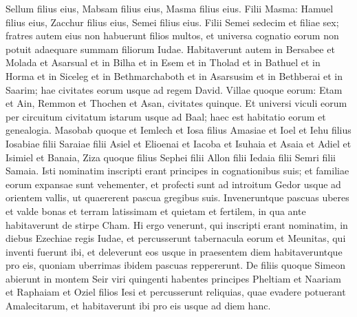 \begin{biblechapter}
\begin{biblechapter}
\begin{biblechapter}
\begin{biblechapter}
\verse Sellum filius eius, Mabsam filius eius, Masma filius eius. 
\verse Filii Masma: Hamuel filius eius, Zacchur filius eius, Semei filius eius. 
\verse Filii Semei sedecim et filiae sex; fratres autem eius non habuerunt filios multos, et universa cognatio eorum non potuit adaequare summam filiorum Iudae.
 \verse Habitaverunt autem in Bersabee et Molada et Asarsual 
\verse et in Bilha et in Esem et in Tholad 
\verse et in Bathuel et in Horma et in Siceleg 
\verse et in Bethmarchaboth et in Asarsusim et in Bethberai et in Saarim; hae civitates eorum usque ad regem David. 
\verse Villae quoque eorum: Etam et Ain, Remmon et Thochen et Asan, civitates quinque. 
\verse Et universi viculi eorum per circuitum civitatum istarum usque ad Baal; haec est habitatio eorum et genealogia.
 \verse Masobab quoque et Iemlech et Iosa filius Amasiae 
\verse et Ioel et Iehu filius Iosabiae filii Saraiae filii Asiel 
\verse et Elioenai et Iacoba et Isuhaia et Asaia et Adiel et Isimiel et Banaia, 
\verse Ziza quoque filius Sephei filii Allon filii Iedaia filii Semri filii Samaia. 
\verse Isti nominatim inscripti erant principes in cognationibus suis; et familiae eorum expansae sunt vehementer, 
\verse et profecti sunt ad introitum Gedor usque ad orientem vallis, ut quaererent pascua gregibus suis. 
\verse Inveneruntque pascuas uberes et valde bonas et terram latissimam et quietam et fertilem, in qua ante habitaverunt de stirpe Cham. 
\verse Hi ergo venerunt, qui inscripti erant nominatim, in diebus Ezechiae regis Iudae, et percusserunt tabernacula eorum et Meunitas, qui inventi fuerunt ibi, et deleverunt eos usque in praesentem diem habitaveruntque pro eis, quoniam uberrimas ibidem pascuas reppererunt.
 \verse De filiis quoque Simeon abierunt in montem Seir viri quingenti habentes principes Pheltiam et Naariam et Raphaiam et Oziel filios Iesi 
\verse et percusserunt reliquias, quae evadere potuerant Amalecitarum, et habitaverunt ibi pro eis usque ad diem hanc.
 

\end{biblechapter}
\end{biblechapter}
\end{biblechapter}
\end{biblechapter}
